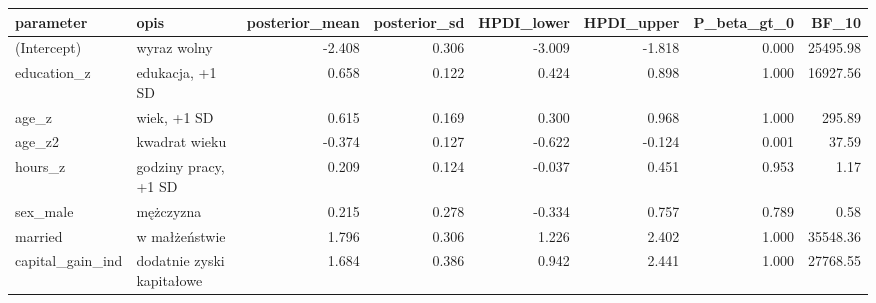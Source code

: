 \begin{tabular}{llrrrrrr}
  \hline
parameter & opis & posterior\_mean & posterior\_sd & HPDI\_lower & HPDI\_upper & P\_beta\_gt\_0 & BF\_10 \\ 
  \hline
(Intercept) & wyraz wolny & -2.408 & 0.306 & -3.009 & -1.818 & 0.000 & 25495.98 \\ 
  education\_z & edukacja, +1 SD & 0.658 & 0.122 & 0.424 & 0.898 & 1.000 & 16927.56 \\ 
  age\_z & wiek, +1 SD & 0.615 & 0.169 & 0.300 & 0.968 & 1.000 & 295.89 \\ 
  age\_z2 & kwadrat wieku & -0.374 & 0.127 & -0.622 & -0.124 & 0.001 & 37.59 \\ 
  hours\_z & godziny pracy, +1 SD & 0.209 & 0.124 & -0.037 & 0.451 & 0.953 & 1.17 \\ 
  sex\_male & mężczyzna & 0.215 & 0.278 & -0.334 & 0.757 & 0.789 & 0.58 \\ 
  married & w małżeństwie & 1.796 & 0.306 & 1.226 & 2.402 & 1.000 & 35548.36 \\ 
  capital\_gain\_ind & dodatnie zyski kapitałowe & 1.684 & 0.386 & 0.942 & 2.441 & 1.000 & 27768.55 \\ 
   \hline
\end{tabular}
